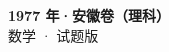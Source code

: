 \documentclass[zihao=-4, a4paper]{ctexart}
\begin{document}
\begin{center}
  {\Large\bfseries 1977 年·安徽卷（理科）}\\[4pt]
  {\large 数学 · 试题版}
\end{center}
\medskip
{}

\end{document}
